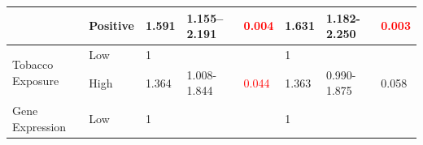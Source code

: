 \documentclass[jpm,article,submit,moreauthors,pdftex]{Definitions/mdpi}
\begin{document}
\begin{table}[hp]
{\begin{tabular}{|l|l|l|l|l|l|l|l|}
\cline{2-8}
                                        & Positive                                                                            & 1.591                                                                          & 1.155–2.191                                                                   & \textcolor{red}{0.004}                                                        & 1.631                                                                          & 1.182-2.250                                                                   & \textcolor{red}{0.003}                                                         \\ 
\hline
\multirow{2}{*}{Tobacco Exposure}       & {\cellcolor[rgb]{0.62,0.812,0.878}}Low                                              & {\cellcolor[rgb]{0.62,0.812,0.878}}1                                           & {\cellcolor[rgb]{0.62,0.812,0.878}}                                           & {\cellcolor[rgb]{0.62,0.812,0.878}}                                           & {\cellcolor[rgb]{0.62,0.812,0.878}}1                                           & {\cellcolor[rgb]{0.62,0.812,0.878}}                                           & {\cellcolor[rgb]{0.62,0.812,0.878}}                                            \\ 
\cline{2-8}
                                        & High                                                                                & 1.364                                                                          & 1.008-1.844                                                                   & \textcolor{red}{0.044}                                                        & 1.363                                                                          & 0.990-1.875                                                                   & 0.058                                                                          \\ 
\hline
\multirow{2}{*}{Gene Expression}                & {\cellcolor[rgb]{0.62,0.812,0.878}}Low                                              & {\cellcolor[rgb]{0.62,0.812,0.878}}1                                           & {\cellcolor[rgb]{0.62,0.812,0.878}}                                           & {\cellcolor[rgb]{0.62,0.812,0.878}}                                           & {\cellcolor[rgb]{0.62,0.812,0.878}}1                                           & {\cellcolor[rgb]{0.62,0.812,0.878}}                                           & {\cellcolor[rgb]{0.62,0.812,0.878}}                                            \\ 

\end{tabular}}
\end{table}
\end{document}
